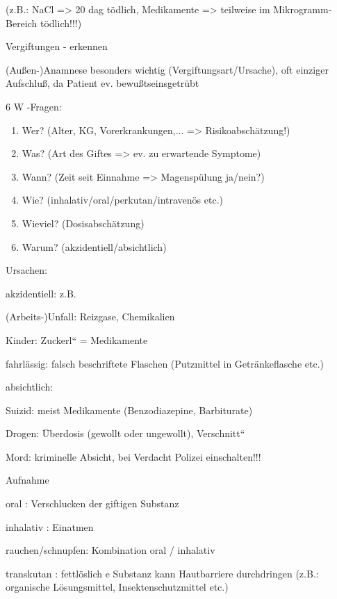 \documentclass{article}
\begin{document}
(z.B.: NaCl ={\textgreater} 20 dag t\"odlich,  Medikamente
={\textgreater} teilweise im Mikrogramm- Bereich t\"odlich!!!)

Vergiftungen - erkennen

(Au{\ss}en-)Anamnese besonders wichtig (Vergiftungsart/Ursache), oft
einziger Aufschlu{\ss}, da Patient ev. bewu{\ss}tseinsgetr\"ubt

6 W -Fragen:

\begin{enumerate}
\item Wer? (Alter, KG, Vorerkrankungen,... ={\textgreater}
Risikoabsch\"atzung!)

\item Was? (Art des Giftes ={\textgreater} ev. zu erwartende Symptome)

\item Wann? (Zeit seit Einnahme ={\textgreater} Magensp\"ulung ja/nein?)

\item Wie? (inhalativ/oral/perkutan/intraven\"os etc.)

\item Wieviel? (Dosisabsch\"atzung)

\item Warum? (akzidentiell/absichtlich)

\end{enumerate}
Ursachen:

akzidentiell: z.B.

(Arbeits-)Unfall: Reizgase, Chemikalien

Kinder: {\quotedblbase}Zuckerl{\textquotedblleft} = Medikamente

fahrl\"assig: falsch beschriftete Flaschen  (Putzmittel in
Getr\"ankeflasche etc.)

absichtlich:

Suizid: meist Medikamente (Benzodiazepine,  Barbiturate)

Drogen: \"Uberdosis (gewollt oder ungewollt), 
{\quotedblbase}Verschnitt{\textquotedblleft}

Mord: kriminelle Absicht, bei Verdacht Polizei  einschalten!!!

Aufnahme

oral : Verschlucken  der giftigen  Substanz 

inhalativ : Einatmen

rauchen/schnupfen: Kombination oral /  inhalativ

transkutan : fettl\"oslich e Substanz kann  Hautbarriere durchdringen
(z.B.:  organische L\"osungsmittel,  Insektenschutzmittel etc.)
\end{document}
